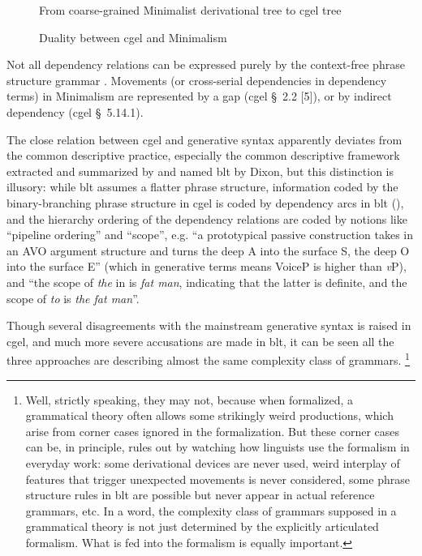 \documentclass{article}
\newcommand*{\citesec}[1]{\S~{#1}}
\newcommand*{\corpus}[1]{\emph{#1}}
\newcommand*{\vP}{\textit{v}P}
\begin{document}
\begin{figure}
    \centering
    
    \caption{From coarse-grained Minimalist derivational tree to \ac{cgel} tree}
    \label{fig:coarse-grained}
\end{figure}

\begin{figure}
    \centering
    
    \caption{Duality between \ac{cgel} and Minimalism}
    \label{fig:cgel-minimalism}
\end{figure}

Not all dependency relations can be expressed purely by the context-free phrase structure grammar 
\citep{pullum2008expressive}. 
Movements (or cross-serial dependencies in dependency terms) in Minimalism 
are represented by a gap (\ac{cgel} \citesec{2.2} [5]),
or by indirect dependency (\ac{cgel} \citesec{5.14.1}).

The close relation between \ac{cgel} and generative syntax apparently deviates 
from the common descriptive practice, 
especially the common descriptive framework extracted and summarized 
by \citet{dixon2009basic1,dixon2010basic2,dixon2012basic3} and named \ac{blt} by Dixon,
but this distinction is illusory:
while \ac{blt} assumes a flatter phrase structure,
information coded by the binary-branching phrase structure in \ac{cgel}
is coded by dependency arcs in \ac{blt} (),
and the hierarchy ordering of the dependency relations 
are coded by notions like ``pipeline ordering'' and ``scope'',
e.g. ``a prototypical passive construction takes in an AVO argument structure 
and turns the deep A into the surface S, the deep O into the surface E''
(which in generative terms means VoiceP is higher than \vP),
and ``the scope of \corpus{the} in  is \corpus{fat man},
indicating that the latter is definite,
and the scope of \corpus{to} is \corpus{the fat man}''.

Though several disagreements with the mainstream generative syntax is raised in \ac{cgel},
and much more severe accusations are made in \ac{blt},
it can be seen all the three approaches are describing almost the same complexity class of grammars.%
\footnote{
    Well, strictly speaking, they may not,
    because when formalized, a grammatical theory often allows some strikingly weird productions,
    which arise from corner cases ignored in the formalization.
    But these corner cases can be, in principle, rules out by watching 
    how linguists use the formalism in everyday work:
    some derivational devices are never used, 
    weird interplay of features that trigger unexpected movements is never considered,
    some phrase structure rules in \ac{blt} are possible but never appear in actual reference grammars, etc.
    In a word, the complexity class of grammars supposed in a grammatical theory 
    is not just determined by the explicitly articulated formalism.
    What is fed into the formalism is equally important.
}
\end{document}
